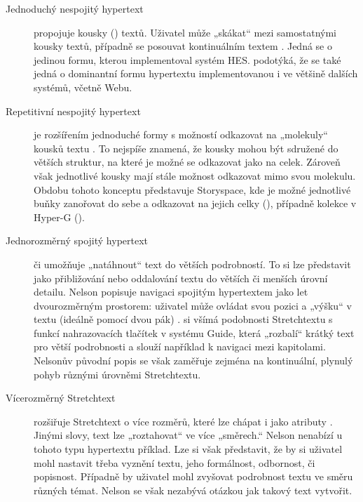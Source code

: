 \label{p:ht:forms}
\begin{description}
  \item[Jednoduchý nespojitý hypertext] propojuje kousky () textů. Uživatel může „skákat“ mezi samostatnými kousky textů, případně se posouvat kontinuálním textem \autocite[10--11]{hin68}.
  Jedná se o jedinou formu, kterou implementoval systém HES. \Textcite[7]{Barnet2014} podotýká, že se také jedná o dominantní formu hypertextu implementovanou i ve většině dalších systémů, včetně Webu.

  \item[Repetitivní nespojitý hypertext] je rozšířením jednoduché formy s možností odkazovat na „molekuly“ kousků textu \autocite[12--13]{hin68}. To nejspíše znamená, že kousky mohou být sdružené do větších struktur, na které je možné se odkazovat jako na celek. Zároveň však jednotlivé kousky mají stále možnost odkazovat mimo svou molekulu.
  Obdobu tohoto konceptu představuje Storyspace, kde je  možné jednotlivé buňky zanořovat do sebe a odkazovat na jejich celky (), případně kolekce v Hyper-G ().

  \item[Jednorozměrný spojitý hypertext] či  umožňuje „natáhnout“ text do větších podrobností. To si lze představit jako přibližování nebo oddalování textu do větších či menších úrovní detailu.
  Nelson popisuje navigaci spojitým hypertextem jako let dvourozměrným prostorem: uživatel může ovládat svou pozici a „výšku“ v textu (ideálně pomocí dvou pák) \autocite[14--18]{hin68}.
  \Textcite[55--56]{Nielsen1995} si všímá podobnosti Stretchtextu s funkcí nahrazovacích tlačítek v systému Guide, která „rozbalí“ krátký text pro větší podrobnosti a slouží například k navigaci mezi kapitolami.
  Nelsonův původní popis se však zaměřuje zejména na kontinuální, plynulý pohyb různými úrovněmi Stretchtextu.

  \item[Vícerozměrný Stretchtext] rozšiřuje Stretchtext o více rozměrů, které lze chápat i jako atributy \autocite[19]{hin68}. Jinými slovy, text lze „roztahovat“ ve více „směrech.“ %
  Nelson nenabízí u tohoto typu hypertextu příklad. Lze si však představit, že by si uživatel mohl nastavit třeba vyznění textu, jeho formálnost, odbornost, či popisnost. Případně by uživatel mohl zvyšovat podrobnost textu ve směru různých témat. Nelson se však nezabývá otázkou jak takový text vytvořit.


\end{description}
